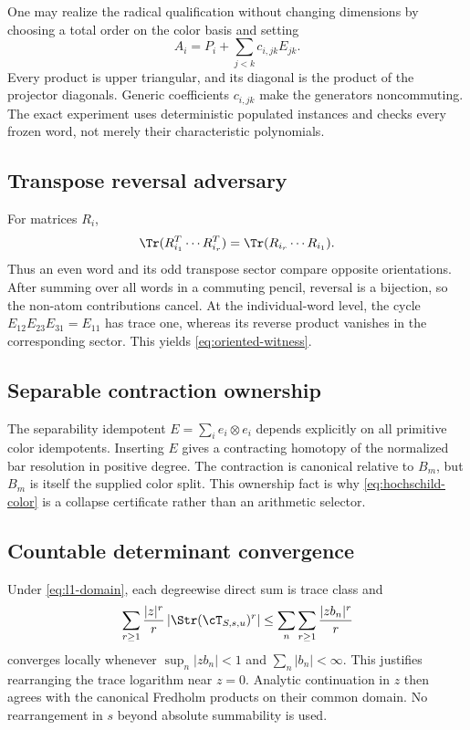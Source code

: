 One may realize the radical qualification without changing dimensions by
choosing a total order on the color basis and setting
\[
 A_i=P_i+\sum_{j<k}c_{i,jk}E_{jk}.
\]
Every product is upper triangular, and its diagonal is the product of the
projector diagonals.  Generic coefficients \(c_{i,jk}\) make the generators
noncommuting.  The exact experiment uses deterministic populated instances
and checks every frozen word, not merely their characteristic polynomials.

\subsection{Transpose reversal adversary}

For matrices \(R_i\),
\[
 \Tr(R_{i_1}^T\cdots R_{i_r}^T)
 =\Tr(R_{i_r}\cdots R_{i_1}).
\]
Thus an even word and its odd transpose sector compare opposite orientations.
After summing over all words in a commuting pencil, reversal is a bijection,
so the non-atom contributions cancel.  At the individual-word level, the
cycle \(E_{12}E_{23}E_{31}=E_{11}\) has trace one, whereas its reverse product
vanishes in the corresponding sector.  This yields
\eqref{eq:oriented-witness}.

\subsection{Separable contraction ownership}

The separability idempotent
\(E=\sum_ie_i\otimes e_i\) depends explicitly on all primitive color
idempotents.  Inserting \(E\) gives a contracting homotopy of the normalized
bar resolution in positive degree.  The contraction is canonical relative to
\(B_m\), but \(B_m\) is itself the supplied color split.  This ownership fact
is why \eqref{eq:hochschild-color} is a collapse certificate rather than an
arithmetic selector.

\subsection{Countable determinant convergence}

Under \eqref{eq:l1-domain}, each degreewise direct sum is trace class and
\[
 \sum_{r\ge1}\frac{|z|^r}{r}
 \left|\Str(\cT_{S,s,u})^r\right|
 \le
 \sum_n\sum_{r\ge1}\frac{|zb_n|^r}{r}
\]
converges locally whenever \(\sup_n|zb_n|<1\) and
\(\sum_n|b_n|<\infty\).  This justifies rearranging the trace logarithm near
\(z=0\).  Analytic continuation in \(z\) then agrees with the canonical
Fredholm products on their common domain.  No rearrangement in \(s\) beyond
absolute summability is used.

